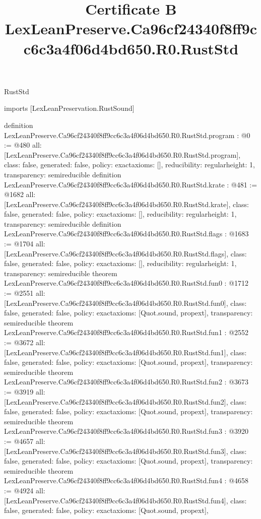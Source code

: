 \begin{lexlean}{RustStd}
\title{Certificate B LexLeanPreserve.Ca96cf24340f8ff9cc6c3a4f06d4bd650.R0.RustStd}
\begin{coremodule}
imports [LexLeanPreservation.RustSound]

definition LexLeanPreserve.Ca96cf24340f8ff9cc6c3a4f06d4bd650.R0.RustStd.program : @0 := @480 {
  all: [LexLeanPreserve.Ca96cf24340f8ff9cc6c3a4f06d4bd650.R0.RustStd.program],
  class: false,
  generated: false,
  policy: exact{axioms: []},
  reducibility: regular{height: 1},
  transparency: semireducible
}
definition LexLeanPreserve.Ca96cf24340f8ff9cc6c3a4f06d4bd650.R0.RustStd.krate : @481 := @1682 {
  all: [LexLeanPreserve.Ca96cf24340f8ff9cc6c3a4f06d4bd650.R0.RustStd.krate],
  class: false,
  generated: false,
  policy: exact{axioms: []},
  reducibility: regular{height: 1},
  transparency: semireducible
}
definition LexLeanPreserve.Ca96cf24340f8ff9cc6c3a4f06d4bd650.R0.RustStd.flags : @1683 := @1704 {
  all: [LexLeanPreserve.Ca96cf24340f8ff9cc6c3a4f06d4bd650.R0.RustStd.flags],
  class: false,
  generated: false,
  policy: exact{axioms: []},
  reducibility: regular{height: 1},
  transparency: semireducible
}
theorem LexLeanPreserve.Ca96cf24340f8ff9cc6c3a4f06d4bd650.R0.RustStd.fun0 : @1712 := @2551 {
  all: [LexLeanPreserve.Ca96cf24340f8ff9cc6c3a4f06d4bd650.R0.RustStd.fun0],
  class: false,
  generated: false,
  policy: exact{axioms: [Quot.sound, propext]},
  transparency: semireducible
}
theorem LexLeanPreserve.Ca96cf24340f8ff9cc6c3a4f06d4bd650.R0.RustStd.fun1 : @2552 := @3672 {
  all: [LexLeanPreserve.Ca96cf24340f8ff9cc6c3a4f06d4bd650.R0.RustStd.fun1],
  class: false,
  generated: false,
  policy: exact{axioms: [Quot.sound, propext]},
  transparency: semireducible
}
theorem LexLeanPreserve.Ca96cf24340f8ff9cc6c3a4f06d4bd650.R0.RustStd.fun2 : @3673 := @3919 {
  all: [LexLeanPreserve.Ca96cf24340f8ff9cc6c3a4f06d4bd650.R0.RustStd.fun2],
  class: false,
  generated: false,
  policy: exact{axioms: [Quot.sound, propext]},
  transparency: semireducible
}
theorem LexLeanPreserve.Ca96cf24340f8ff9cc6c3a4f06d4bd650.R0.RustStd.fun3 : @3920 := @4657 {
  all: [LexLeanPreserve.Ca96cf24340f8ff9cc6c3a4f06d4bd650.R0.RustStd.fun3],
  class: false,
  generated: false,
  policy: exact{axioms: [Quot.sound, propext]},
  transparency: semireducible
}
theorem LexLeanPreserve.Ca96cf24340f8ff9cc6c3a4f06d4bd650.R0.RustStd.fun4 : @4658 := @4924 {
  all: [LexLeanPreserve.Ca96cf24340f8ff9cc6c3a4f06d4bd650.R0.RustStd.fun4],
  class: false,
  generated: false,
  policy: exact{axioms: [Quot.sound, propext]},
}
\end{coremodule}
\end{lexlean}
